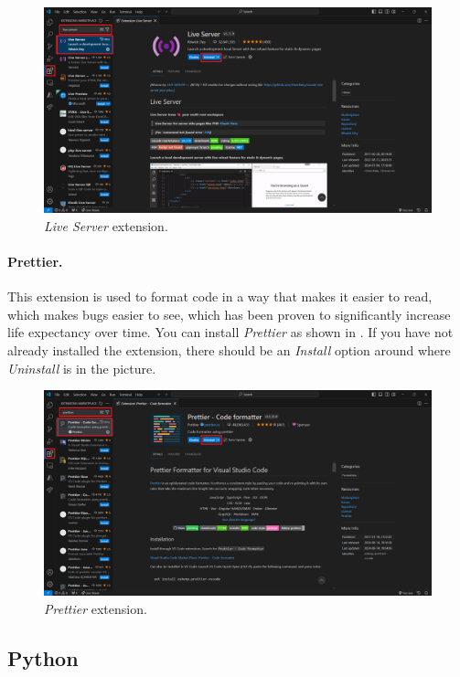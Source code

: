 \documentclass[a4paper,10pt]{article}
\begin{document}
\begin{figure}[htbp]
    \centering
    \includegraphics[width=\textwidth]{live_server.png}
    \caption{\emph{Live Server} extension.}
    \label{fig:live_server}   
\end{figure}

\paragraph{Prettier.} This extension is used to format code in a way that makes it easier to read, which makes bugs easier to see, which has been proven to significantly increase life expectancy over time. You can install \emph{Prettier} as shown in . If you have not already installed the extension, there should be an \emph{Install} option around where \emph{Uninstall} is in the picture.

\begin{figure}[htbp]
    \centering
    \includegraphics[width=\textwidth]{prettier.png}
    \caption{\emph{Prettier} extension.}
    \label{fig:prettier}   
\end{figure}

\subsection{Python}
\end{document}
